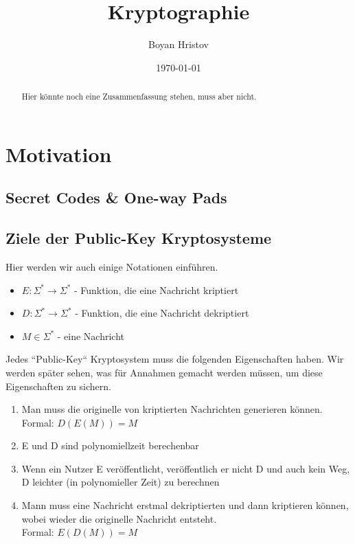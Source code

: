 \documentclass[12pt,a4paper]{article}
\author{Boyan Hristov}
\title{Kryptographie}
\date{\today}
\theoremstyle{definition}
\begin{document}
    \maketitle
    \begin{abstract}
        Hier könnte noch eine Zusammenfassung stehen, muss aber nicht.
    \end{abstract}
    \section{Motivation}

    \subsection{Secret Codes \& One-way Pads}
    \textellipsis

    \subsection{Ziele der Public-Key Kryptosysteme}
    Hier werden wir auch einige Notationen einführen.

    \begin{itemize}
        \item $E: \Sigma^* \longrightarrow \Sigma^*$ - Funktion, die eine Nachricht kriptiert
        \item $D: \Sigma^* \longrightarrow \Sigma^*$ - Funktion, die eine Nachricht dekriptiert
        \item $M \in \Sigma^*$ - eine Nachricht
    \end{itemize}

    Jedes ``Public-Key`` Kryptosystem muss die folgenden Eigenschaften haben. Wir werden später sehen, was für
    Annahmen gemacht werden müssen, um diese Eigenschaften zu sichern.

    \begin{enumerate}
        \item Man muss die originelle von kriptierten Nachrichten generieren können. \\
        Formal: $D(E(M)) = M$
        \item E und D sind polynomiellzeit berechenbar
        \item Wenn ein Nutzer E veröffentlicht, veröffentlich er nicht D und auch kein Weg, D leichter (in polynomieller
        Zeit) zu berechnen
        \item Mann muss eine Nachricht erstmal dekriptierten und dann kriptieren können, wobei wieder die originelle
        Nachricht entsteht. \\
        Formal: $E(D(M)) = M$
    \end{enumerate}
\end{document}
